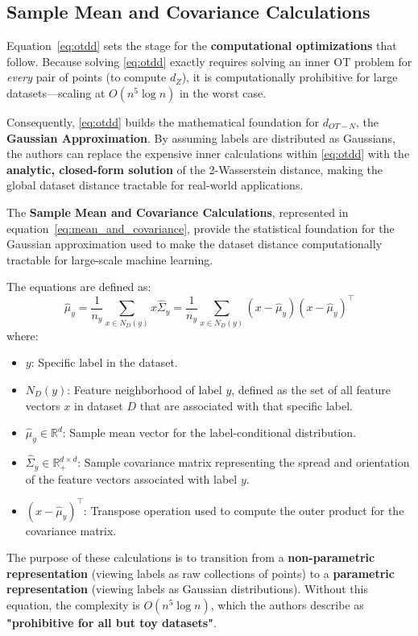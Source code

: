 \documentclass[11pt, a4paper]{article}
\theoremstyle{plain} %
\theoremstyle{definition} %
\begin{document}
		\subsection{Sample Mean and Covariance Calculations}
		\label{sec:sample_mean_covariance}
			Equation~\ref{eq:otdd} sets the stage for the \textbf{computational optimizations} that follow. Because solving \cref{eq:otdd} exactly requires solving an inner OT problem for \textit{every} pair of points (to compute $d_Z$), it is computationally prohibitive for large datasets---scaling at $O(n^5 \log n)$ in the worst case.

			Consequently, \cref{eq:otdd} builds the mathematical foundation for \textbf{$d_{OT-N}$}, the \textbf{Gaussian Approximation}. By assuming labels are distributed as Gaussians, the authors can replace the expensive inner calculations within \cref{eq:otdd} with the \textbf{analytic, closed-form solution} of the 2-Wasserstein distance, making the global dataset distance tractable for real-world applications.

			The \textbf{Sample Mean and Covariance Calculations}, represented in equation~\ref{eq:mean_and_covariance}, provide the statistical foundation for the Gaussian approximation used to make the dataset distance computationally tractable for large-scale machine learning.

			The equations are defined as:
			\begin{equation}
				\label{eq:mean_and_covariance}
				\hat{\mu}_y = \frac{1}{n_y} \sum_{x \in N_D(y)} x
				\hat{\Sigma}_y = \frac{1}{n_y} \sum_{x \in N_D(y)} (x - \hat{\mu}_y)(x - \hat{\mu}_y)^\top
			\end{equation}
			where:
			\begin{itemize}
				\item $y$: Specific label in the dataset.
				\item $N_D(y)$: Feature neighborhood of label $y$, defined as the set of all feature vectors $x$ in dataset $D$ that are associated with that specific label.
				\item $\hat{\mu}_y \in \mathbb{R}^d$: Sample mean vector for the label-conditional distribution.
				\item $\hat{\Sigma}_y \in \mathbb{R}^{d \times d}_+$: Sample covariance matrix representing the spread and orientation of the feature vectors associated with label $y$.
				\item $(x - \hat{\mu}_y)^\top$: Transpose operation used to compute the outer product for the covariance matrix.
			\end{itemize}
			The purpose of these calculations is to transition from a \textbf{non-parametric representation} (viewing labels as raw collections of points) to a \textbf{parametric representation} (viewing labels as Gaussian distributions). Without this equation, the complexity is $O(n^5 \log n)$, which the authors describe as \textbf{"prohibitive for all but toy datasets"}.
\end{document}
